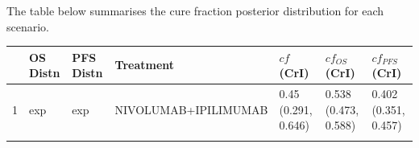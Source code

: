 \documentclass[
]{article}
\begin{document}
The table below summarises the cure fraction posterior distribution for
each scenario.

\begin{longtable}[]{@{}lllllll@{}}
\toprule
\begin{minipage}[b]{0.02\columnwidth}\raggedright
\strut
\end{minipage} & \begin{minipage}[b]{0.09\columnwidth}\raggedright
OS Distn\strut
\end{minipage} & \begin{minipage}[b]{0.09\columnwidth}\raggedright
PFS Distn\strut
\end{minipage} & \begin{minipage}[b]{0.15\columnwidth}\raggedright
Treatment\strut
\end{minipage} & \begin{minipage}[b]{0.15\columnwidth}\raggedright
\(cf\) (CrI)\strut
\end{minipage} & \begin{minipage}[b]{0.15\columnwidth}\raggedright
\(cf_{OS}\) (CrI)\strut
\end{minipage} & \begin{minipage}[b]{0.15\columnwidth}\raggedright
\(cf_{PFS}\) (CrI)\strut
\end{minipage}\tabularnewline
\midrule
\endhead
\begin{minipage}[t]{0.02\columnwidth}\raggedright
1\strut
\end{minipage} & \begin{minipage}[t]{0.09\columnwidth}\raggedright
exp\strut
\end{minipage} & \begin{minipage}[t]{0.09\columnwidth}\raggedright
exp\strut
\end{minipage} & \begin{minipage}[t]{0.15\columnwidth}\raggedright
NIVOLUMAB+IPILIMUMAB\strut
\end{minipage} & \begin{minipage}[t]{0.15\columnwidth}\raggedright
0.45 (0.291, 0.646)\strut
\end{minipage} & \begin{minipage}[t]{0.15\columnwidth}\raggedright
0.538 (0.473, 0.588)\strut
\end{minipage} & \begin{minipage}[t]{0.15\columnwidth}\raggedright
0.402 (0.351, 0.457)\strut
\end{minipage}\tabularnewline
\begin{minipage}[t]{0.02\columnwidth}\raggedright

\end{minipage}
\end{longtable}
\end{document}
